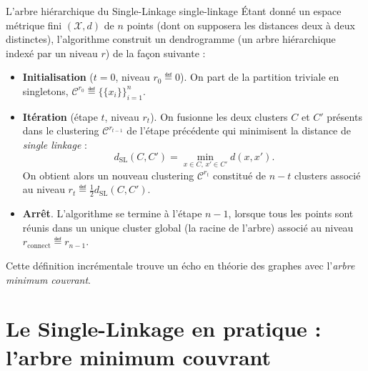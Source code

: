 \begin{Definition}{L'arbre hiérarchique du Single-Linkage \cite{DendriteSingleLinkage1951, GowerRoss1969}}{single-linkage}
Étant donné un espace métrique fini $(\mathcal X, d)$ de $n$ points (dont on supposera les distances deux à deux distinctes), l'algorithme construit un dendrogramme (un arbre hiérarchique indexé par un niveau $r$) de la façon suivante :
\begin{itemize}
    \item \textbf{Initialisation} ($t=0$, niveau $r_0 \eqdef 0$). On part de la partition triviale en singletons, $\mathcal{C}^{r_0} \eqdef \bigl\{\{x_i\}\bigr\}_{i=1}^n$.
    \item \textbf{Itération} (étape $t$, niveau $r_t$). On fusionne les deux clusters $C$ et $C'$ présents dans le clustering $\mathcal{C}^{r_{t-1}}$ de l'étape précédente qui minimisent la distance de \emph{single linkage} :
    \[
        d_{\mathrm{SL}}(C, C') = \min_{x \in C, \, x' \in C'} d(x,x').
    \]
    On obtient alors un nouveau clustering $\mathcal{C}^{r_t}$ constitué de $n-t$ clusters associé au niveau $r_t \eqdef \tfrac12 d_{\mathrm{SL}}(C, C')$.
    \item \textbf{Arrêt}. L'algorithme se termine à l'étape $n-1$, lorsque tous les points sont réunis dans un unique cluster global (la racine de l'arbre) associé au niveau $r_{\mathrm{connect}} \eqdef r_{n-1}$.
\end{itemize}
\end{Definition}


Cette définition incrémentale trouve un écho en théorie des graphes avec l'\emph{arbre minimum couvrant}. 



\section{Le Single-Linkage en pratique : l'arbre minimum couvrant}

